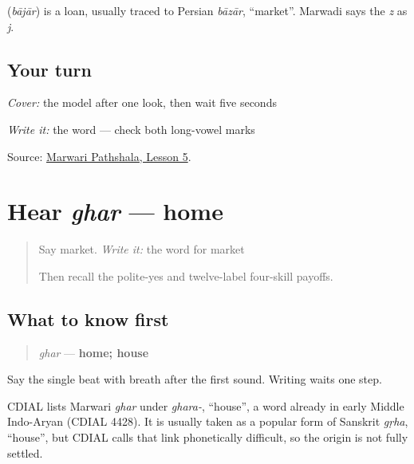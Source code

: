 \begin{cousinweb}
\textbf{} (\emph{bājār}) is a loan, usually traced to Persian \emph{bāzār}, \textquotedblleft{}market\textquotedblright{}. Marwadi says the \emph{z} as \emph{j}.
\end{cousinweb}

\subsection*{Your turn}
\emph{Cover:} the model after one look, then wait five seconds

\emph{Write it:} the word — check both long-vowel marks

\begin{tcolorbox}[breakable,colback=teal!4,colframe=teal!35!black,title={Before you move on}]
Source: \href{https://www.marwaripathshala.com/marwari-lesson-5-english}{Marwari Pathshala, Lesson 5}.
\end{tcolorbox}
\section[ghar]{Hear \emph{ghar} — home}

\label{lesson:MW-C10-hear-ghar}



\begin{quote}
Say market. \emph{Write it:} the word for market

Then recall the polite-yes and twelve-label four-skill payoffs.
\end{quote}

\subsection*{What to know first}
\begin{quote}
\emph{ghar} — \textbf{home; house}
\end{quote}

Say the single beat with breath after the first sound. Writing waits one step.

\begin{cousinweb}
CDIAL lists Marwari \emph{ghar} under \emph{ghara-}, \textquotedblleft{}house\textquotedblright{}, a word already in early Middle Indo-Aryan (CDIAL 4428). It is usually taken as a popular form of Sanskrit \emph{gṛha}, \textquotedblleft{}house\textquotedblright{}, but CDIAL calls that link phonetically difficult, so the origin is not fully settled.
\end{cousinweb}

